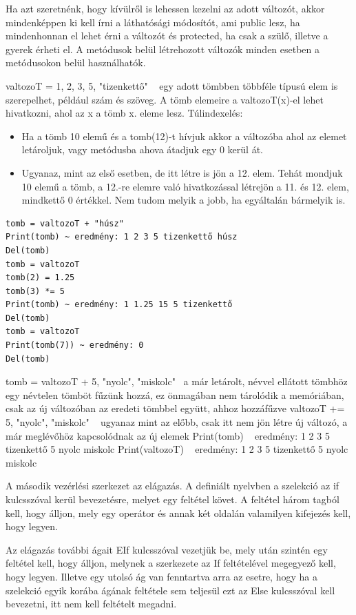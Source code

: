 Ha azt szeretnénk, hogy kívülről is lehessen kezelni az adott változót, akkor mindenképpen ki kell írni a láthatósági módosítót, ami public lesz, ha mindenhonnan el lehet érni a változót és protected, ha csak a szülő, illetve a gyerek érheti el. A metódusok belül létrehozott változók minden esetben a metódusokon belül használhatók.

valtozoT = {1, 2, 3, 5, "tizenkettő"} ~ egy adott tömbben többféle típusú elem is szerepelhet, például szám és szöveg. A tömb elemeire a valtozoT(x)-el lehet hivatkozni, ahol az x a tömb x. eleme lesz.
Túlindexelés:
\begin{itemize}
\item Ha a tömb 10 elemű és a tomb(12)-t hívjuk akkor a változóba ahol az elemet letároljuk, vagy metódusba ahova átadjuk egy 0 kerül át.
\item Ugyanaz, mint az első esetben, de itt létre is jön a 12. elem. Tehát mondjuk 10 elemű a tömb, a 12.-re elemre való hivatkozással létrejön a 11. és 12. elem, mindkettő 0 értékkel.
Nem tudom melyik a jobb, ha egyáltalán bármelyik is.
\end{itemize}

\begin{verbatim}
tomb = valtozoT + "húsz"
Print(tomb) ~ eredmény: 1 2 3 5 tizenkettő húsz
Del(tomb)
tomb = valtozoT
tomb(2) = 1.25
tomb(3) *= 5
Print(tomb) ~ eredmény: 1 1.25 15 5 tizenkettő
Del(tomb)
tomb = valtozoT
Print(tomb(7)) ~ eredmény: 0
Del(tomb)
\end{verbatim}

tomb = valtozoT + {5, "nyolc", "miskolc"} ~a már letárolt, névvel ellátott tömbhöz egy névtelen tömböt fűzünk hozzá, ez önmagában nem tárolódik a memóriában, csak az új változóban az eredeti tömbbel együtt, ahhoz hozzáfűzve
valtozoT += {5, "nyolc", "miskolc"} ~ ugyanaz mint az előbb, csak itt nem jön létre új változó, a már meglévőhöz kapcsolódnak az új elemek
Print(tomb) ~ eredmény: 1 2 3 5 tizenkettő 5 nyolc miskolc
Print(valtozoT) ~ eredmény: 1 2 3 5 tizenkettő 5 nyolc miskolc

A második vezérlési szerkezet az elágazás. A definiált nyelvben a szelekció az if kulcsszóval kerül bevezetésre, melyet egy feltétel követ. A feltétel három tagból kell, hogy álljon, mely egy operátor és annak két oldalán valamilyen kifejezés kell, hogy legyen.

Az elágazás további ágait EIf kulcsszóval vezetjük be, mely után szintén egy feltétel kell, hogy álljon, melynek a szerkezete az If feltételével megegyező kell, hogy legyen. Illetve egy utolsó ág van fenntartva arra az esetre, hogy ha a szelekció egyik korába ágának feltétele sem teljesül ezt az Else kulcsszóval kell bevezetni, itt nem kell feltételt megadni.

